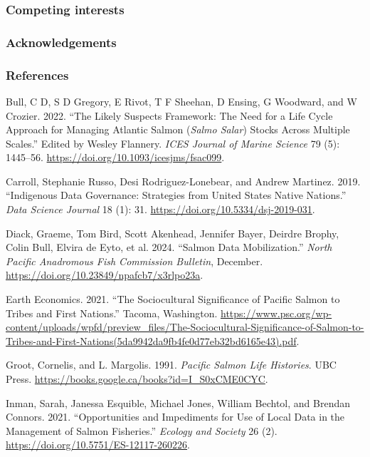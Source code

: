\documentclass[
  letterpaper,
  DIV=11,
  numbers=noendperiod]{scrartcl}
\newlength{\cslhangindent}
\newenvironment{CSLReferences}[2] %
 {\begin{list}{}{%
  \setlength{\itemindent}{0pt}
  \setlength{\leftmargin}{0pt}
  \setlength{\parsep}{0pt}
  \ifodd #1
   \setlength{\leftmargin}{\cslhangindent}
   \setlength{\itemindent}{-1\cslhangindent}
  \fi
  \setlength{\itemsep}{#2\baselineskip}}}
 {\end{list}}
\begin{document}
\subsubsection{Competing interests}\label{competing-interests}

\subsubsection{Acknowledgements}\label{acknowledgements}

\subsubsection{References}\label{references}

\label{refs}
\begin{CSLReferences}{1}{0}
Bull, C D, S D Gregory, E Rivot, T F Sheehan, D Ensing, G Woodward, and
W Crozier. 2022. {``The Likely Suspects Framework: The Need for a Life
Cycle Approach for Managing Atlantic Salmon ({\emph{Salmo Salar}})
Stocks Across Multiple Scales.''} Edited by Wesley Flannery. \emph{ICES
Journal of Marine Science} 79 (5): 1445--56.
\url{https://doi.org/10.1093/icesjms/fsac099}.

Carroll, Stephanie Russo, Desi Rodriguez-Lonebear, and Andrew Martinez.
2019. {``Indigenous Data Governance: Strategies from United States
Native Nations.''} \emph{Data Science Journal} 18 (1): 31.
\url{https://doi.org/10.5334/dsj-2019-031}.

Diack, Graeme, Tom Bird, Scott Akenhead, Jennifer Bayer, Deirdre Brophy,
Colin Bull, Elvira de Eyto, et al. 2024. {``Salmon Data Mobilization.''}
\emph{North Pacific Anadromous Fish Commission Bulletin}, December.
\url{https://doi.org/10.23849/npafcb7/x3rlpo23a}.

Earth Economics. 2021. {``The Sociocultural Significance of Pacific
Salmon to Tribes and First Nations.''} Tacoma, Washington.
\url{https://www.psc.org/wp-content/uploads/wpfd/preview_files/The-Sociocultural-Significance-of-Salmon-to-Tribes-and-First-Nations(5da9942da9fb4fe0d77eb32bd6165e43).pdf}.

Groot, Cornelis, and L. Margolis. 1991. \emph{Pacific Salmon Life
Histories}. UBC Press.
\url{https://books.google.ca/books?id=I_S0xCME0CYC}.

Inman, Sarah, Janessa Esquible, Michael Jones, William Bechtol, and
Brendan Connors. 2021. {``Opportunities and Impediments for Use of Local
Data in the Management of Salmon Fisheries.''} \emph{Ecology and
Society} 26 (2). \url{https://doi.org/10.5751/ES-12117-260226}.


\end{CSLReferences}
\end{document}
